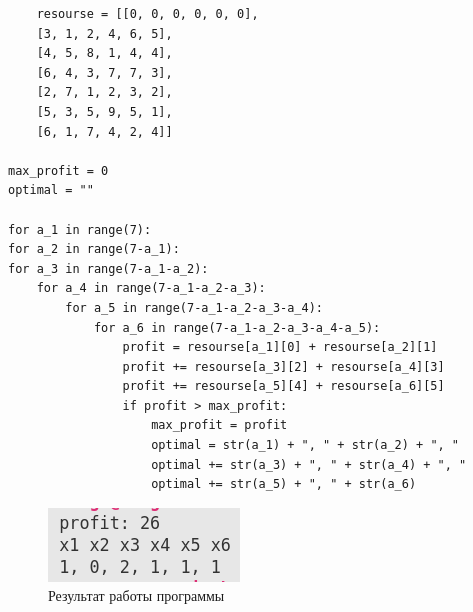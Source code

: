\begin{lstlisting}
    resourse = [[0, 0, 0, 0, 0, 0],
    [3, 1, 2, 4, 6, 5],
    [4, 5, 8, 1, 4, 4],
    [6, 4, 3, 7, 7, 3],
    [2, 7, 1, 2, 3, 2],
    [5, 3, 5, 9, 5, 1],
    [6, 1, 7, 4, 2, 4]]

max_profit = 0
optimal = ""

for a_1 in range(7):
for a_2 in range(7-a_1):
for a_3 in range(7-a_1-a_2):
    for a_4 in range(7-a_1-a_2-a_3):
        for a_5 in range(7-a_1-a_2-a_3-a_4):
            for a_6 in range(7-a_1-a_2-a_3-a_4-a_5):
                profit = resourse[a_1][0] + resourse[a_2][1]
                profit += resourse[a_3][2] + resourse[a_4][3]
                profit += resourse[a_5][4] + resourse[a_6][5]
                if profit > max_profit:
                    max_profit = profit
                    optimal = str(a_1) + ", " + str(a_2) + ", "
                    optimal += str(a_3) + ", " + str(a_4) + ", "
                    optimal += str(a_5) + ", " + str(a_6)

\end{lstlisting}

\begin{figure}[h]
    \centering
    \includegraphics[]{9.png}
    \centering
    \caption{Результат работы программы}
\end{figure}